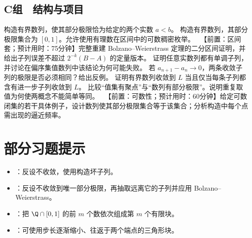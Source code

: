 \subsection*{C组　结构与项目}
\begin{enumerate}[label=\textbf{11.\arabic*.},resume]
  \mustdo 构造有界数列，使其部分极限恰为给定的两个实数 \(a<b\)。
  \mustdo 构造有界数列，其部分极限集合为 \([0,1]\)。允许使用有理数在区间中的可数稠密枚举。
  \projectdo\ 【前置：区间套；预计用时：75分钟】完整重建 Bolzano--Weierstrass 定理的二分区间证明，并给出子列误差不超过 \(2^{-k}(B-A)\) 的定量版本。
  \optionaldo 证明任意实数列都有单调子列，并讨论在偏序集值数列中该结论为何可能失败。
  \optionaldo 若 \(a_{n+1}-a_n\to0\)，两条收敛子列的极限是否必须相同？给出反例。
  \optionaldo 证明有界数列收敛到 \(L\) 当且仅当每条子列都含有进一步子列收敛到 \(L\)。
  \opendo 比较“值集有聚点”与“数列有部分极限”。说明重复取值为何使两概念不能简单等同。
  \projectdo\ 【前置：可数性；预计用时：60分钟】给定可数闭集的若干具体例子，设计数列使其部分极限集合等于该集合；分析构造中每个点需出现的逼近频率。
\end{enumerate}

\section*{部分习题提示}
\begin{itemize}
 \item {}：反设不收敛，使用构造坏子列。
 \item {}：反设不收敛到唯一部分极限，再抽取远离它的子列并应用 Bolzano--Weierstrass。
 \item {}：把 \(\Q\cap[0,1]\) 的前 \(m\) 个数依次组成第 \(m\) 个有限块。
 \item {}：可使用步长逐渐缩小、往返于两个端点的三角形块。
\end{itemize}

